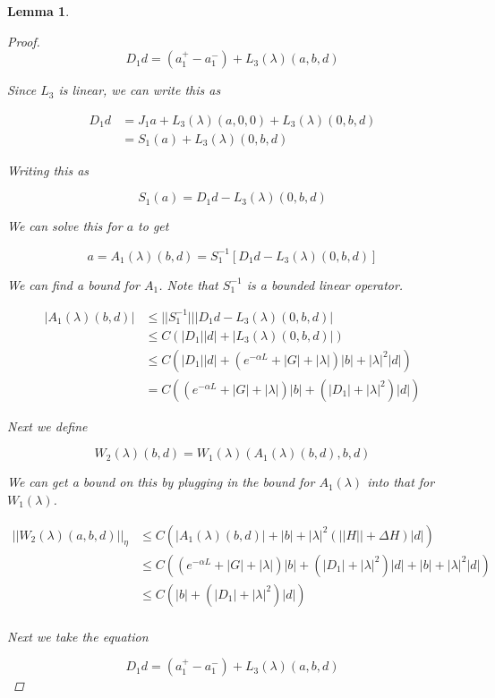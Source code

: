 \documentclass[12pt]{article}
\newtheorem{lemma}{Lemma}
\begin{document}
\begin{lemma}
\begin{proof}
\[
D_1 d = (a^+_1 - a^-_1) + L_3(\lambda)(a,b,d)
\] 

Since $L_3$ is linear, we can write this as

\begin{align*}
D_1 d &= J_1 a + L_3(\lambda)(a, 0, 0) + L_3(\lambda)(0, b, d) \\
&= S_1(a) + L_3(\lambda)(0, b, d) 
\end{align*}

Writing this as 

\[
S_1(a) = D_1 d - L_3(\lambda)(0, b, d) 
\]

We can solve this for $a$ to get

\begin{equation}
a = A_1(\lambda)(b,d) = S_1^{-1}[D_1 d - L_3(\lambda)(0, b, d)] 
\end{equation}

We can find a bound for $A_1$. Note that $S_1^{-1}$ is a bounded linear operator.

\begin{align*}
|A_1(\lambda)(b,d)| &\leq ||S_1^{-1}|||D_1 d - L_3(\lambda)(0, b, d)| \\
&\leq C (|D_1||d| + |L_3(\lambda)(0, b, d)|) \\
&\leq C (|D_1||d| + (e^{-\alpha L} + |G| + |\lambda|)|b| + |\lambda|^2|d| )\\
&= C ((e^{-\alpha L} + |G| + |\lambda|)|b| + (|D_1| + |\lambda|^2)|d| )
\end{align*}

Next we define

\begin{equation}\label{W2def}
W_2(\lambda)(b,d) = W_1(\lambda)(A_1(\lambda)(b,d),b,d)
\end{equation}

We can get a bound on this by plugging in the bound for $A_1(\lambda)$ into that for $W_1(\lambda)$.

\begin{align*}
||W_2(\lambda)(a,b,d)||_\eta &\leq C(|A_1(\lambda)(b,d)| + |b| + |\lambda|^2 ( ||H|| + \Delta H ) |d|) \\
&\leq C((e^{-\alpha L} + |G| + |\lambda|)|b| + (|D_1| + |\lambda|^2)|d| + |b| + |\lambda|^2 |d|) \\
&\leq C(|b| + (|D_1| + |\lambda|^2)|d|) \\
\end{align*} 

Next we take the equation

\[
D_1 d = (a^+_1 - a^-_1) + L_3(\lambda)(a,b,d)
\]


\end{proof}
\end{lemma}
\end{document}
